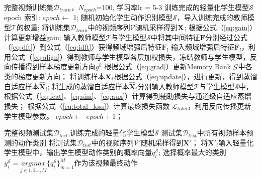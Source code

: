 \documentclass[10.5pt,letterpaper]{article}
\begin{document}
	
\begin{algorithm}
		\caption{ 频域自适应适配蒸馏方法}
		\label{alg:method}
		\small
		\begin{algorithmic}[1]
				\REQUIRE 完整视频训练集$\mathcal{D}_{train}$，$N_{epoch}$=100, 学习率lr = 5-3 
				\ENSURE 训练完成的轻量化学生模型$\mathcal{S}$
				\STATE epoch 索引: $epoch$$\leftarrow$ 1;
				\STATE 随机初始化学生动作识别模型$\mathcal{S}$，导入训练完成的教师模型$\mathcal{T}$的权重;
				\STATE 将训练集$\mathcal{D}_{train}$中的视频序列$\mathcal{V}$随机采样得到$\textbf X$;
				\STATE 根据公式（\ref{eq:gain}）计算更新增益gain;
				\STATE 输入教师模型$\mathcal{T}$与学生模型$\mathcal{S}$中将其中间特征$\textbf{F}$分别经过公式（\ref{eq:dft}）到公式（\ref{eq:idft}）获得频域增强后特征$\bar{\textbf{F}}_l$
				\STATE 输入频域增强后特征$\bar{\textbf{F}}_l$，利用公式（\ref{eq:align}）得到教师与学生模型各层加权损失，冻结教师与学生模型，反向传播得到样本梯度更新方向$g^k$
				\STATE 根据公式（\ref{eq:grad}）更新Memory Bank $\mathcal{G}$中各类的梯度更新方向；
				\ENDFOR
				\ENDIF
				\STATE 将训练样本$\textbf X_i$根据公式（\ref{eq:update}），进行更新，得到蒸馏自适应样本$\hat{\textbf{X}}_i$;
				\STATE 将生成的蒸馏自适应样本$\hat{\textbf{X}}_i$分别输入教师模型$\mathcal{T}$与学生模型$\mathcal{S}$中，根据公式（\ref{eq:feat}、\ref{eq:sim}、\ref{eq:aux}）计算得到辅助损失与通道级自适应蒸馏损失；
				\STATE 根据公式（\ref{eq:total_loss}）计算最终损失函数 $\mathcal{L}_{total}$，利用反向传播更新学生模型参数。
				\STATE $epoch$$\leftarrow$ $epoch+1$；
				\ENDWHILE
			\end{algorithmic}
	\end{algorithm}
	\begin{algorithm}
		\caption{ The algorithm flow of inference.}
		\label{alg:inference}
		\small
		\begin{algorithmic}[2]
				\REQUIRE 完整视频测试集$\mathcal{D}_{test}$,训练完成的轻量化学生模型$\mathcal{S}$
				\ENSURE 测试集$\mathcal{D}_{test}$中所有视频样本预测的动作类别
				\STATE 将测试集$\mathcal{D}_{test}$中的视频序列$\mathcal{V'}$随机采样得到$\textbf{X}'$；
				\STATE 将$\textbf{X}'_i$输入轻量化学生模型中，输出学生模型动作类别的概率向量$q^{\mathcal{S}}_i$;
				\STATE 选择概率最大的类别$y^{\mathcal{S}}_i=\underset{j \in {1,2...,M}}{argmax} \{q^{\mathcal{S}}_i\}^M_{m=1}$作为该视频最终动作
				\ENDFOR
			\end{algorithmic}
	\end{algorithm}
\end{document}
